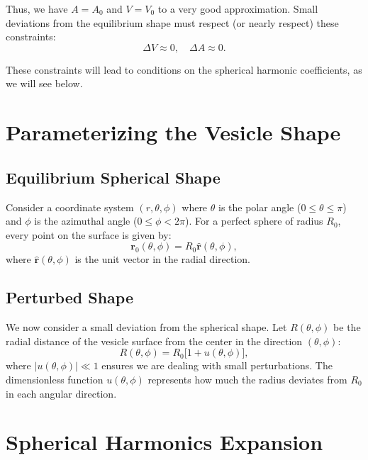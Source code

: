 \documentclass[12pt,a4paper]{article}
\begin{document}
Thus, we have $A = A_0$ and $V = V_0$ to a very good approximation. Small deviations from the equilibrium shape must respect (or nearly respect) these constraints:
\begin{equation}
\Delta V \approx 0, \quad \Delta A \approx 0.
\end{equation}

These constraints will lead to conditions on the spherical harmonic coefficients, as we will see below.

\section{Parameterizing the Vesicle Shape}

\subsection{Equilibrium Spherical Shape}

Consider a coordinate system $(r,\theta,\phi)$ where $\theta$ is the polar angle ($0 \leq \theta \leq \pi$) and $\phi$ is the azimuthal angle ($0 \leq \phi < 2\pi$). For a perfect sphere of radius $R_0$, every point on the surface is given by:
\begin{equation}
\mathbf{r}_0(\theta,\phi) = R_0 \hat{\mathbf{r}}(\theta,\phi),
\end{equation}
where $\hat{\mathbf{r}}(\theta,\phi)$ is the unit vector in the radial direction.

\subsection{Perturbed Shape}

We now consider a small deviation from the spherical shape. Let $R(\theta,\phi)$ be the radial distance of the vesicle surface from the center in the direction $(\theta,\phi)$:
\begin{equation}
R(\theta,\phi) = R_0\bigl[1+u(\theta,\phi)\bigr],
\end{equation}
where $|u(\theta,\phi)| \ll 1$ ensures we are dealing with small perturbations. The dimensionless function $u(\theta,\phi)$ represents how much the radius deviates from $R_0$ in each angular direction.




\section{Spherical Harmonics Expansion}
\end{document}
